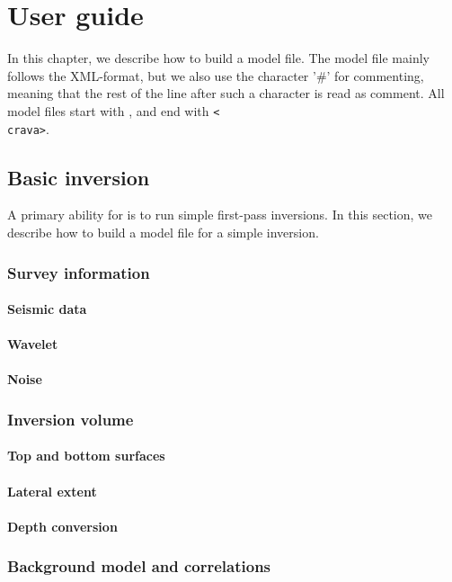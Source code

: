 \chapter{User guide}
\label{sec:userguide}

In this chapter, we describe how to build a \crava model file. The model file mainly follows the XML-format, but we also use the character '\#' for commenting, meaning that the rest of the line after such a character is read as comment. All model files start with , and end with \texttt{<\\crava>}.

\section{Basic inversion}
\label{sec:basicinv}
A primary ability for \crava is to run simple first-pass inversions. In this section, we describe how to build a model file for a simple inversion.  
\subsection{Survey information}
\subsubsection{Seismic data}
\subsubsection{Wavelet}
\subsubsection{Noise}
\subsection{Inversion volume}
\subsubsection{Top and bottom surfaces}
\subsubsection{Lateral extent}
\subsubsection{Depth conversion}
\subsection{Background model and correlations}
